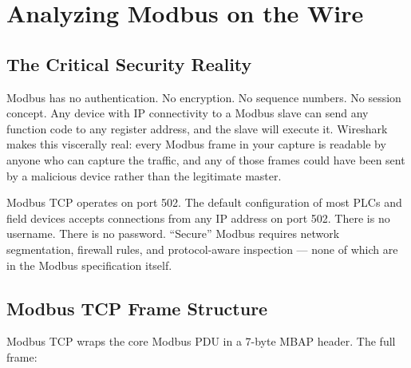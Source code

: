 \documentclass[12pt,twoside,openright]{memoir}
\begin{document}
\chapter{Analyzing Modbus on the Wire}

\section{The Critical Security Reality}

Modbus has no authentication. No encryption. No sequence numbers. No session concept. Any device with IP connectivity to a Modbus slave can send any function code to any register address, and the slave will execute it. Wireshark makes this viscerally real: every Modbus frame in your capture is readable by anyone who can capture the traffic, and any of those frames could have been sent by a malicious device rather than the legitimate master.

\begin{warningbox}
Modbus TCP operates on port 502. The default configuration of most PLCs and field devices accepts connections from any IP address on port 502. There is no username. There is no password. ``Secure'' Modbus requires network segmentation, firewall rules, and protocol-aware inspection --- none of which are in the Modbus specification itself.
\end{warningbox}

\section{Modbus TCP Frame Structure}

Modbus TCP wraps the core Modbus PDU in a 7-byte MBAP header. The full frame:
\end{document}
